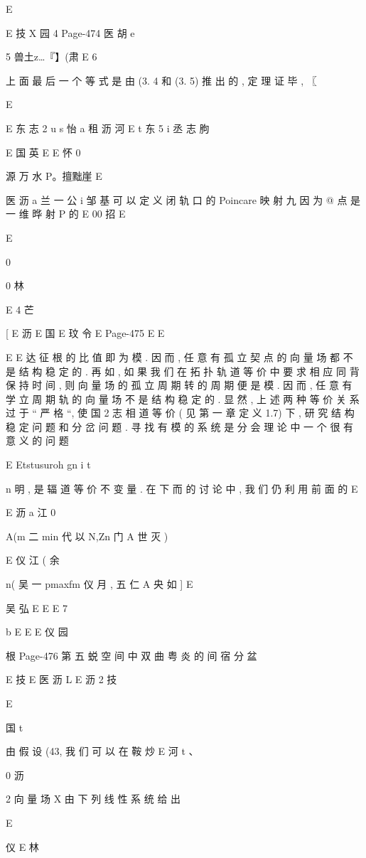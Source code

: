 {{E

E 技 X 园 4
Page-474
医 胡 e

5 兽土z…『】(肃 E 6

上 面 最 后 一 个 等 式 是 由 (3. 4 和 (3. 5) 推 出 的 , 定 理 证 毕 , 〖

E

E 东 志 2 u s 怡 a 租 沥 河
E t 东 5 i 丞 志 朐

E 国 英
E
E 怀 0

源 万 水 P。擅黜崖 E

医 沥 a 兰 一 公 i
邹 基 可 以 定 义 闭 轨 口 的 Poincare 映 射 九 因 为 @ 点 是 一 维 晔 射 P 的
E 00 招
E

E

0

0 林

E 4 芒

[
E 沥
E
国
E
玟
令
E
Page-475
E E

E
E 达
征 根 的 比 值 即 为 模 . 因 而 , 任 意 有 孤 立 契 点 的 向 量 场 都 不 是 结 构 稳
定 的 . 再 如 , 如 果 我 们 在 拓 扑 轨 道 等 价 中 要 求 相 应 同 背 保 持 时 间 ,
则 向 量 场 的 孤 立 周 期 转 的 周 期 便 是 模 . 因 而 , 任 意 有 学 立 周 期 轨 的
向 量 场 不 是 结 构 稳 定 的 . 显 然 , 上 述 两 种 等 价 关 系 过 于 “ 严 格 “, 使
国 2 志 相
道 等 价 ( 见 第 一 章 定 义 1.7) 下 , 研 究 结 构 稳 定 问 题 和 分 岔 问 题 . 寻
找 有 模 的 系 统 是 分 会 理 论 中 一 个 很 有 意 义 的 问 题

E
Etstusuroh gn i
t

n
明 , 是 辐 道 等 价 不 变 量 . 在 下 而 的 讨 论 中 , 我 们 仍 利 用 前 面 的
E

E 沥 a 江 0

A(m 二 min 代 以 N,Zn 门 A 世 灭 )

E 仪 江 ( 余

n( 吴 一 pmaxfm 仪 月 , 五 仁 A 央 如 ]
E

吴 弘
E E E 7

b
E
E
E 仪
园

根
Page-476
第 五 蜕 空 间 中 双 曲 粤 炎 的 间 宿 分 盆

E 技
E
医 沥 L
E 沥 2 技

E

国 t

由 假 设 (43, 我 们 可 以 在 鞍 炒 %
E 河 t 、

0 沥

2 向 量 场 X 由 下 列 线 性 系 统 给 出

E
{仪 E 林

}}}
